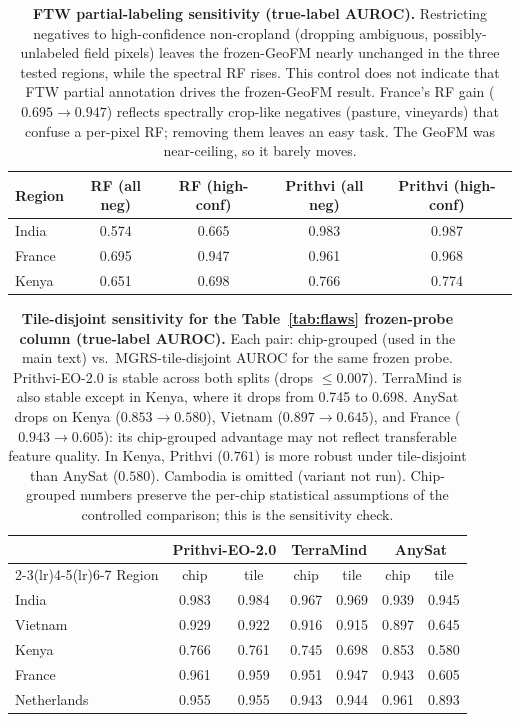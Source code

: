 \documentclass{article}
\newcommand{\tablebodygap}{\vspace{0.45em}}
\begin{document}
\begin{table}[H]\centering\small
\caption{\textbf{FTW partial-labeling sensitivity (true-label AUROC).} Restricting
negatives to high-confidence non-cropland (dropping ambiguous, possibly-unlabeled
field pixels) leaves the frozen-GeoFM nearly unchanged in the three tested regions,
while the spectral RF rises. This control does not indicate that FTW partial
annotation drives the frozen-GeoFM result. France's RF gain
($0.695 \to 0.947$) reflects spectrally crop-like negatives (pasture, vineyards)
that confuse a per-pixel RF; removing them leaves an easy task. The GeoFM was
near-ceiling, so it barely moves.}
\label{tab:partial}
\tablebodygap
\begin{tabular}{lcccc}
\toprule
Region & RF (all neg) & RF (high-conf) & Prithvi (all neg) & Prithvi (high-conf) \\
\midrule
India  & 0.574 & 0.665 & 0.983 & 0.987 \\
France & 0.695 & 0.947 & 0.961 & 0.968 \\
Kenya  & 0.651 & 0.698 & 0.766 & 0.774 \\
\bottomrule
\end{tabular}
\end{table}

\begin{table}[H]\centering\small
\caption{\textbf{Tile-disjoint sensitivity for the Table~\ref{tab:flaws}
frozen-probe column (true-label AUROC).} Each pair: chip-grouped (used in the main
text) vs.\ MGRS-tile-disjoint AUROC for the same frozen probe. Prithvi-EO-2.0 is
stable across both splits (drops $\le 0.007$). TerraMind is also stable except in
Kenya, where it drops from 0.745 to 0.698. AnySat
drops on Kenya ($0.853 \to 0.580$), Vietnam ($0.897 \to 0.645$), and France
($0.943 \to 0.605$): its chip-grouped advantage may not reflect transferable feature
quality. In Kenya, Prithvi ($0.761$) is more robust under tile-disjoint than AnySat
($0.580$). Cambodia is omitted (variant not run). Chip-grouped numbers preserve
the per-chip statistical assumptions of the controlled comparison; this is the
sensitivity check.}
\label{tab:tilesplit}
\tablebodygap
\setlength{\tabcolsep}{7pt}
\begin{tabular}{lcccccc}
\toprule
        & \multicolumn{2}{c}{Prithvi-EO-2.0} & \multicolumn{2}{c}{TerraMind} & \multicolumn{2}{c}{AnySat} \\
\cmidrule(lr){2-3}\cmidrule(lr){4-5}\cmidrule(lr){6-7}
Region  & chip & tile & chip & tile & chip & tile \\
\midrule
India       & 0.983 & 0.984 & 0.967 & 0.969 & 0.939 & 0.945 \\
Vietnam     & 0.929 & 0.922 & 0.916 & 0.915 & 0.897 & 0.645 \\
Kenya       & 0.766 & 0.761 & 0.745 & 0.698 & 0.853 & 0.580 \\
France      & 0.961 & 0.959 & 0.951 & 0.947 & 0.943 & 0.605 \\
Netherlands & 0.955 & 0.955 & 0.943 & 0.944 & 0.961 & 0.893 \\
\bottomrule
\end{tabular}
\end{table}
\end{document}
